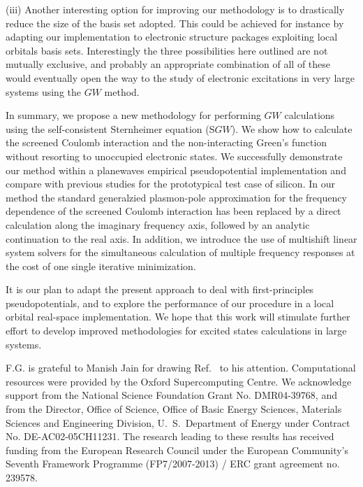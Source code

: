 \documentclass[twocolumn,prb,showpacs,superscriptaddress]{revtex4}
\begin{document}
(iii) Another interesting option for improving our methodology is 
to drastically reduce the size of the basis set adopted. This could be achieved
for instance by adapting our implementation to electronic structure packages
exploiting local orbitals basis sets.\cite{siesta}
Interestingly the three possibilities here outlined are not mutually exclusive,
and probably an appropriate combination of all of these would eventually open
the way to the study of electronic excitations in
very large systems using the $GW$ method.

In summary, we propose a new methodology for performing $GW$ calculations
using the self-consistent Sternheimer equation (S$GW$). We show how
to calculate the screened Coulomb interaction and the non-interacting
Green's function without resorting to unoccupied electronic states.
We successfully demonstrate our method within a planewaves empirical
pseudopotential implementation and compare with previous studies for the
prototypical test case of silicon. In our method the standard generalzied plasmon-pole
approximation for the frequency dependence of the screened Coulomb interaction
has been replaced by a direct calculation along the imaginary frequency axis,
followed by an analytic continuation to the real axis.
In addition, we introduce the use of multishift linear system solvers for the simultaneous
calculation of multiple frequency responses at the cost of one single
iterative minimization.

It is our plan to adapt the present approach to deal with first-principles
pseudopotentials, and to explore the performance of our procedure in a local
orbital real-space implementation. We hope that this work will stimulate further effort
to develop improved methodologies for excited states calculations in large systems.

\begin{acknowledgments}
F.G. is grateful to Manish Jain for drawing Ref.\  to his attention.
Computational resources were provided by the Oxford Supercomputing Centre.
We acknowledge support from the National Science Foundation Grant No. DMR04-39768, and from
the Director, Office of Science, Office of Basic Energy Sciences, Materials Sciences
and Engineering Division, U.\ S.\ Department of Energy under Contract No. DE-AC02-05CH11231.
The research leading to these results has received funding from the European Research
Council under the European Community's Seventh Framework Programme (FP7/2007-2013) / ERC 
grant agreement no. 239578.

\end{acknowledgments}
\end{document}
